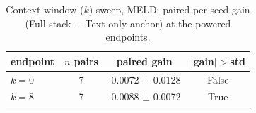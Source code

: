 \begin{table}[t]
\centering
\caption{Context-window ($k$) sweep, MELD: paired per-seed gain (Full stack $-$ Text-only anchor) at the powered endpoints.}
\label{tab:k-sweep-endpoints}
\begin{tabular}{lccc}
\toprule
endpoint & $n$ pairs & paired gain & $|$gain$|>$std \\
\midrule
$k=0$ & 7 & -0.0072 $\pm$ 0.0128 & False \\
$k=8$ & 7 & -0.0088 $\pm$ 0.0072 & True \\
\bottomrule
\end{tabular}
\end{table}
